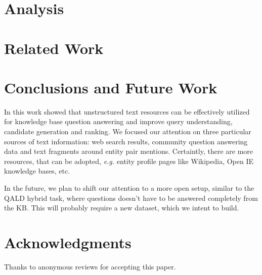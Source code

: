 \documentclass{sig-alternate-05-2015}
\newcommand{\eg}[0]{{\em e.g. }}
\begin{document}
\section{Analysis}
\label{section:analysis}


\section{Related Work}
\label{section:related_work}


\section{Conclusions and Future Work}

In this work showed that unstructured text resources can be effectively utilized for knowledge base question answering and improve query understanding, candidate generation and ranking.
We focused our attention on three particular sources of text information: web search results, community question answering data and text fragments around entity pair mentions.
Certaintly, there are more resources, that can be adopted, \eg entity profile pages like Wikipedia, Open IE knowledge bases, etc.

In the future, we plan to shift our attention to a more open setup, similar to the QALD hybrid task, where questions doesn't have to be answered completely from the KB.
This will probably require a new dataset, which we intent to build.



\section{Acknowledgments}
Thanks to anonymous reviews for accepting this paper.

%

%
%
\end{document}
